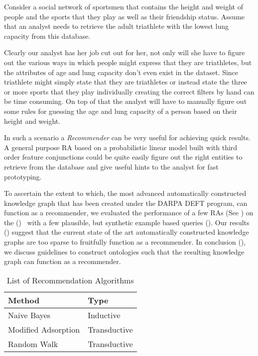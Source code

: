 \begin{example}\label{ex:recommender}
  Consider a social network of sportsmen that contains the height
  and weight of people and the sports that they play as well as their friendship
  status. Assume that an analyst needs to retrieve the adult triathlete
  with the lowest lung capacity from this database.

  Clearly our analyst has her job cut out for her, not only will she have to
  figure out the various ways in which people might express that they are
  triathletes, but the attributes of age and lung capacity don't even exist in
  the dataset. Since triathlete might simply state that they are triathletes or
  instead state the three or more sports that they play individually creating
  the correct filters by hand can be time consuming. On top of that the analyst
  will have to manually figure out some rules for guessing the age and lung capacity of
  a person  based on their height and weight.

  In such a scenario a \textit{Recommender} can be very useful for achieving quick
  results. A general purpose RA based on a probabilistic linear model built with
  third order feature conjunctions could be quite easily figure out the right
  entities to retrieve from the database and give useful hints to the analyst
  for fast prototyping.
\end{example}

To ascertain the extent to which, the most advanced automatically
constructed knowledge graph that has been created under the DARPA DEFT program,
can function as a recommender, we evaluated the performance of a few RAs (See ) on the
\dataset ()~\cite{BBN-REPORT} with a few plausible, but
synthetic example based queries ().
Our results () suggest that the current state of
the art automatically constructed knowledge graphs are too sparse to fruitfully
function as a recommender. In conclusion (), we discuss
guidelines to construct ontologies such that the resulting knowledge graph can
function as a recommender.

\begin{table}[htbp]
  \centering
  \begin{tabular}{l l}
    Method              & Type         \\\hline
    Naive Bayes         & Inductive    \\
    Modified Adsorption & Transductive \\
    Random Walk         & Transductive \\
  \end{tabular}
  \caption{List of Recommendation Algorithms}
  \label{tab:ra}
\end{table}
